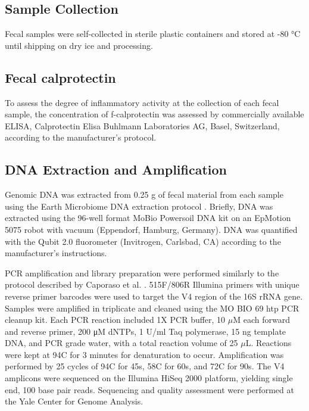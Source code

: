 \subsection{Sample Collection}

Fecal samples were self-collected in sterile plastic containers and stored at 
-80 °C until shipping on dry ice and processing.

\subsection{Fecal calprotectin} 

To assess the degree of inflammatory activity at the collection of each fecal 
sample, the concentration of f-calprotectin was assessed by commercially 
available ELISA, Calprotectin Elisa Buhlmann Laboratories AG, Basel, 
Switzerland, according to the manufacturer's protocol. 

\subsection{DNA Extraction and Amplification}

Genomic DNA was extracted from 0.25 g of fecal material from each sample using 
the Earth Microbiome DNA extraction protocol \cite{EMP2011}. Briefly, DNA was 
extracted using the 96-well format MoBio Powersoil DNA kit on an EpMotion 5075 
robot with vacuum (Eppendorf, Hamburg, Germany). DNA was quantified with the 
Qubit 2.0 fluorometer (Invitrogen, Carlsbad, CA) according to the 
manufacturer's instructions.

PCR amplification and library preparation were performed similarly to the 
protocol described by Caporaso et al. \cite{Caporaso2011proceedings}. 515F/806R 
Illumina primers with unique reverse primer barcodes were used to target the V4 
region of the 16S rRNA gene. Samples were amplified in triplicate and cleaned 
using the MO BIO 69 htp PCR cleanup kit. Each PCR reaction included 1X PCR 
buffer, 10 $\mu$M each forward and reverse primer, 200 μM dNTPs, 1 U/ml Taq 
polymerase, 15 ng template DNA, and PCR grade water, with a total reaction 
volume of 25 $\mu$L. Reactions were kept at 94\textdegree C for 3 minutes for 
denaturation to occur. Amplification was performed by 25 cycles of 
94\textdegree C for 45s, 58\textdegree C for 60s, and 72\textdegree C for 90s.  
The V4 amplicons were sequenced on the Illumina HiSeq 2000 platform, yielding 
single end, 100 base pair reads. Sequencing and quality assessment were 
performed at the Yale Center for Genome Analysis.

